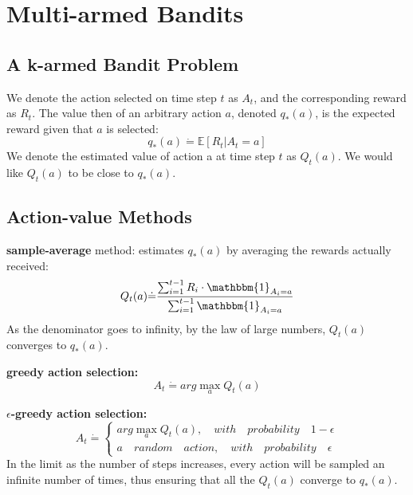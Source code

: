 \chapter{Multi-armed Bandits}
\label{chap:ch_2_Multi-armed_Bandits}

\section{A k-armed Bandit Problem}
We denote the action selected on time step $t$ as $A_t$, and the corresponding reward as $R_t$. The value then of an arbitrary action $a$, denoted $q_*(a)$, is the expected reward given that $a$ is selected:
\begin{equation}
        q_*(a) \dot{=} \mathbb{E}[R_t|A_t=a]
\end{equation}
We denote the estimated value of action a at time step $t$ as $Q_t(a)$. We would like $Q_t(a)$ to be close to $q_*(a)$.
\section{Action-value Methods}
\textbf{sample-average} method: estimates $q_*(a)$ by averaging the rewards actually received:
\begin{equation}
    Q_t(a) \dot{=} \frac{\sum_{i=1}^{t-1}R_i \cdot \mathbbm{1}_{A_i=a}}{\sum_{i=1}^{t-1}\mathbbm{1}_{A_i=a}}
\end{equation}
As the denominator goes to infinity, by the law of large numbers, $Q_t(a)$ converges to $q_*(a)$.

\textbf{greedy action selection:} 
\begin{equation}
    A_t \dot{=} arg\max_{a}Q_t(a)
\end{equation}

\textbf{$\epsilon$-greedy action selection:}
\begin{equation}
    A_t \dot{=} \begin{cases}
        arg \max_a{Q_t(a)}, \quad with \quad probability \quad 1-\epsilon \\
        a \quad random \quad action, \quad with \quad probability \quad \epsilon 

\end{cases}
\end{equation}
In the limit as the number of steps increases, every action will be sampled an infinite number of times, thus ensuring that all the $Q_t(a)$ converge to $q_*(a)$.

